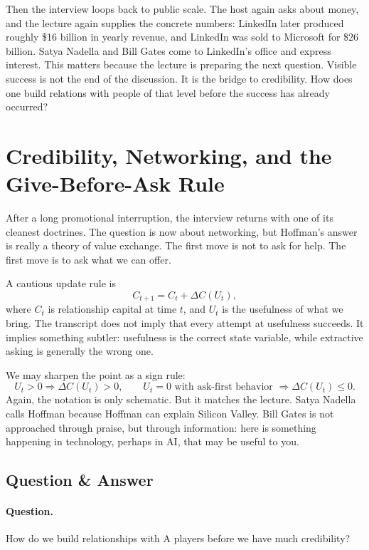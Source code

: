 Then the interview loops back to public scale. The host again asks about money, and the lecture again supplies the concrete numbers: LinkedIn later produced roughly \$16 billion in yearly revenue, and LinkedIn was sold to Microsoft for \$26 billion. Satya Nadella and Bill Gates come to LinkedIn's office and express interest. This matters because the lecture is preparing the next question. Visible success is not the end of the discussion. It is the bridge to credibility. How does one build relations with people of that level before the success has already occurred?

\section{Credibility, Networking, and the Give-Before-Ask Rule}

After a long promotional interruption, the interview returns with one of its cleanest doctrines. The question is now about networking, but Hoffman's answer is really a theory of value exchange. The first move is not to ask for help. The first move is to ask what we can offer.

A cautious update rule is
\begin{equation}
C_{t+1}=C_t+\Delta C(U_t),
\end{equation}
where \(C_t\) is relationship capital at time \(t\), and \(U_t\) is the usefulness of what we bring. The transcript does not imply that every attempt at usefulness succeeds. It implies something subtler: usefulness is the correct state variable, while extractive asking is generally the wrong one.

We may sharpen the point as a sign rule:
\begin{equation}
U_t>0 \Longrightarrow \Delta C(U_t)>0,
\qquad
U_t=0 \text{ with ask-first behavior } \Longrightarrow \Delta C(U_t)\leq 0.
\end{equation}
Again, the notation is only schematic. But it matches the lecture. Satya Nadella calls Hoffman because Hoffman can explain Silicon Valley. Bill Gates is not approached through praise, but through information: here is something happening in technology, perhaps in AI, that may be useful to you.

\subsection{Question \& Answer}

\paragraph{Question.}
How do we build relationships with A players before we have much credibility?

